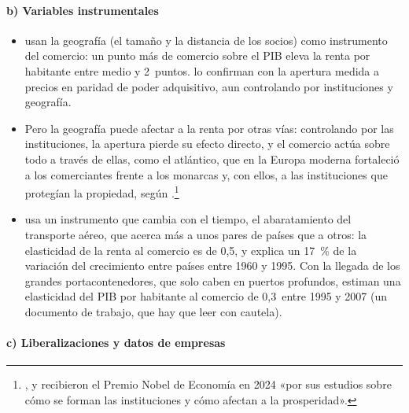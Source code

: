 \documentclass[11pt]{article}
\begin{document}
\paragraph{b) Variables instrumentales}

\begin{itemize}
\item \textcite{FrankelRomer1999Does} usan la geografía (el tamaño y la distancia de los socios) como instrumento del comercio: un punto más de comercio sobre el PIB eleva la renta por habitante entre medio y 2~puntos. \textcite{AlcalaCiccone2004Trade} lo confirman con la apertura medida a precios en paridad de poder adquisitivo, aun controlando por instituciones y geografía.
\item Pero la geografía puede afectar a la renta por otras vías: controlando por las instituciones, la apertura pierde su efecto directo\nocite{RodrikSubramanianTrebbi2004Institutions}, y el comercio actúa sobre todo a través de ellas, como el atlántico, que en la Europa moderna fortaleció a los comerciantes frente a los monarcas y, con ellos, a las instituciones que protegían la propiedad, según \textcite{AcemogluJohnsonRobinson2005Rise}.\footnote{,  y  recibieron el Premio Nobel de Economía en 2024 «por sus estudios sobre cómo se forman las instituciones y cómo afectan a la prosperidad»\nocite{NobelPrize2024}.}
\item \textcite{Feyrer2019Trade} usa un instrumento que cambia con el tiempo, el abaratamiento del transporte aéreo, que acerca más a unos pares de países que a otros: la elasticidad de la renta al comercio es de 0,5, y explica un 17~\% de la variación del crecimiento entre países entre 1960 y 1995. Con la llegada de los grandes portacontenedores, que solo caben en puertos profundos, \textcite{AltomonteBonacorsiColantone2018Trade} estiman una elasticidad del PIB por habitante al comercio de 0,3~entre 1995 y 2007 (un documento de trabajo, que hay que leer con cautela).
\end{itemize}

\paragraph{c) Liberalizaciones y datos de empresas}
\end{document}
